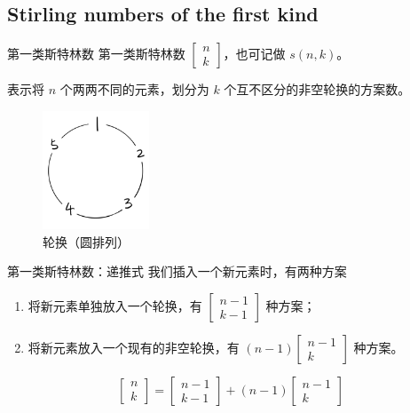 \documentclass[12pt,aspectratio=169,handout]{beamer}
\begin{document}




\subsection[第一类斯特林数]{Stirling numbers of the first kind}

\begin{frame}[fragile]{第一类斯特林数}
第一类斯特林数 $\begin{bmatrix}n\\ k\end{bmatrix}$，也可记做 $s(n, k)$。

表示将 $n$ 个两两不同的元素，划分为 $k$ 个互不区分的非空轮换的方案数。

\begin{figure}
  \centering
  \includegraphics[height=100pt]{circle.png}
  \caption{轮换（圆排列）}
\end{figure}
\end{frame}

\begin{frame}[fragile]{第一类斯特林数：递推式}
我们插入一个新元素时，有两种方案

\begin{enumerate}
  \item 将新元素单独放入一个轮换，有 $\begin{bmatrix}n-1\\ k-1\end{bmatrix}$ 种方案；
  \item 将新元素放入一个现有的非空轮换，有 $(n-1)\begin{bmatrix}n-1\\ k\end{bmatrix}$ 种方案。
\end{enumerate}

$$
\begin{bmatrix}n\\ k\end{bmatrix} = \begin{bmatrix}n-1\\ k-1\end{bmatrix} + (n-1)\begin{bmatrix}n-1\\ k\end{bmatrix}
$$
\end{frame}
\end{document}
